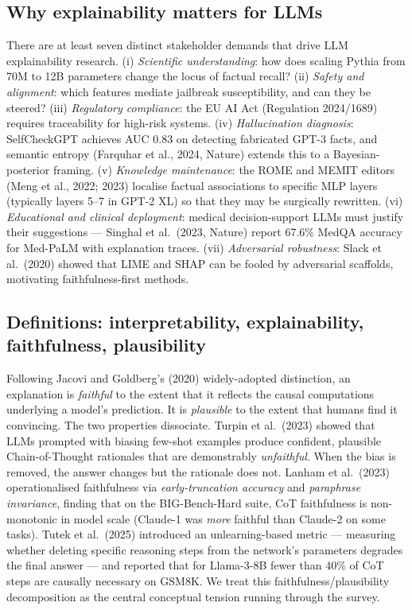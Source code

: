 \documentclass{article}
\begin{document}
\subsection{Why explainability matters for LLMs}\label{why-explainability-matters-for-llms}

There are at least seven distinct stakeholder demands that drive LLM explainability research. (i) \emph{Scientific understanding}: how does scaling Pythia from 70M to 12B parameters change the locus of factual recall? (ii) \emph{Safety and alignment}: which features mediate jailbreak susceptibility, and can they be steered? (iii) \emph{Regulatory compliance}: the EU AI Act (Regulation 2024/1689) requires traceability for high-risk systems. (iv) \emph{Hallucination diagnosis}: SelfCheckGPT \citep{manakul2023selfcheckgptzerore} achieves AUC 0.83 on detecting fabricated GPT-3 facts, and semantic entropy (Farquhar et al., 2024, Nature) extends this to a Bayesian-posterior framing. (v) \emph{Knowledge maintenance}: the ROME and MEMIT editors (Meng et al., 2022; 2023) localise factual associations to specific MLP layers (typically layers 5--7 in GPT-2 XL) so that they may be surgically rewritten. (vi) \emph{Educational and clinical deployment}: medical decision-support LLMs must justify their suggestions --- Singhal et al.~(2023, Nature) report 67.6\% MedQA accuracy for Med-PaLM with explanation traces. (vii) \emph{Adversarial robustness}: Slack et al.~(2020) showed that LIME and SHAP can be fooled by adversarial scaffolds, motivating faithfulness-first methods.

\subsection{Definitions: interpretability, explainability, faithfulness, plausibility}\label{definitions-interpretability-explainability-faithfulness-plausibility}

Following Jacovi and Goldberg's (2020) widely-adopted distinction, an explanation is \emph{faithful} to the extent that it reflects the causal computations underlying a model's prediction. It is \emph{plausible} to the extent that humans find it convincing. The two properties dissociate. Turpin et al.~(2023) showed that LLMs prompted with biasing few-shot examples produce confident, plausible Chain-of-Thought rationales that are demonstrably \emph{unfaithful}. When the bias is removed, the answer changes but the rationale does not. Lanham et al.~(2023) operationalised faithfulness via \emph{early-truncation accuracy} and \emph{paraphrase invariance}, finding that on the BIG-Bench-Hard suite, CoT faithfulness is non-monotonic in model scale (Claude-1 was \emph{more} faithful than Claude-2 on some tasks). Tutek et al.~(2025) introduced an unlearning-based metric --- measuring whether deleting specific reasoning steps from the network's parameters degrades the final answer --- and reported that for Llama-3-8B fewer than 40\% of CoT steps are causally necessary on GSM8K. We treat this faithfulness/plausibility decomposition as the central conceptual tension running through the survey.
\end{document}
